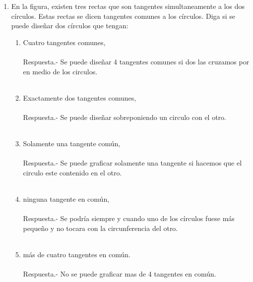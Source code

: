 \documentclass[10pt]{article}
\begin{document}
\begin{enumerate}
\item En la figura, existen tres rectas que son tangentes simultaneamente a los dos círculos. Estas rectas se dicen tangentes comunes a los círculos. Diga si se puede diseñar dos círculos que tengan:

    \begin{center}
    \end{center}

    \begin{enumerate}[\bfseries a)]
	
	\item Cuatro tangentes comunes,\\\\
	    Respuesta.-\; Se puede diseñar 4 tangentes comunes si dos las cruzamos por en medio de los circulos.\\\\

	\item Exactamente dos tangentes comunes,\\\\
	    Respuesta.-\; Se puede diseñar sobreponiendo un circulo con el otro.\\\\

	\item Solamente una tangente común,\\\\
	    Respuesta.-\; Se puede graficar solamente una tangente si hacemos que el circulo este contenido en el otro.\\\\

	\item ninguna tangente en común,\\\\
	    Respuesta.-\; Se podría siempre y cuando uno de los círculos fuese más pequeño y no tocara con la circunferencia del otro.\\\\  

	\item más de cuatro tangentes en común.\\\\
	    Respuesta.-\; No se puede graficar mas de 4 tangentes en común.\\\\


\end{enumerate}
\end{enumerate}
\end{document}
